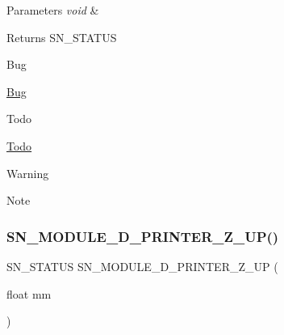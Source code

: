 \begin{DoxyParams}{Parameters}
{\em void} & \\
\hline
\end{DoxyParams}
\begin{DoxyReturn}{Returns}
S\+N\+\_\+\+S\+T\+A\+T\+US 
\end{DoxyReturn}
\begin{DoxyRefDesc}{Bug}
\item[\hyperlink{bug__bug000009}{Bug}]\end{DoxyRefDesc}
\begin{DoxyRefDesc}{Todo}
\item[\hyperlink{todo__todo000009}{Todo}]\end{DoxyRefDesc}
\begin{DoxyWarning}{Warning}

\end{DoxyWarning}
\begin{DoxyNote}{Note}

\end{DoxyNote}
\mbox{\label{group__D_ga4671a91d49ef53f67f1d203f18355c63}} 
\subsubsection{\texorpdfstring{S\+N\+\_\+\+M\+O\+D\+U\+L\+E\+\_\+D\+\_\+\+P\+R\+I\+N\+T\+E\+R\+\_\+\+Z\+\_\+\+U\+P()}{SN\_MODULE\_3D\_PRINTER\_Z\_UP()}}
{\footnotesize\ttfamily S\+N\+\_\+\+S\+T\+A\+T\+US S\+N\+\_\+\+M\+O\+D\+U\+L\+E\+\_\+D\+\_\+\+P\+R\+I\+N\+T\+E\+R\+\_\+\+Z\+\_\+\+UP (\begin{DoxyParamCaption}\item[{float}]{mm }\end{DoxyParamCaption})}


